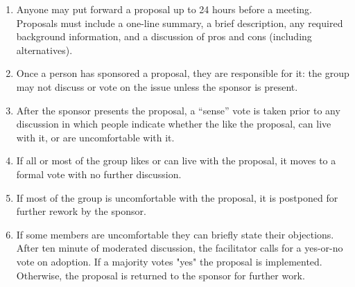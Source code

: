 \documentclass[10pt,letterpaper]{article}
\begin{document}
\begin{enumerate}

\item
  Anyone may put forward a proposal up to 24 hours before a meeting.
  Proposals must include a one-line summary,
  a brief description,
  any required background information,
  and a discussion of pros and cons (including alternatives).

\item
  Once a person has sponsored a proposal, they are responsible for it:
  the group may not discuss or vote on the issue unless the sponsor is present.

\item
  After the sponsor presents the proposal,
  a ``sense'' vote is taken prior to any discussion
  in which people indicate whether the like the proposal,
  can live with it,
  or are uncomfortable with it.

\item
  If all or most of the group likes or can live with the proposal,
  it moves to a formal vote with no further discussion.

\item
  If most of the group is uncomfortable with the proposal,
  it is postponed for further rework by the sponsor.

\item
  If some members are uncomfortable they can briefly state their objections.
  After ten minute of moderated discussion,
  the facilitator calls for a yes-or-no vote on adoption.
  If a majority votes "yes" the proposal is implemented.
  Otherwise, the proposal is returned to the sponsor for further work.

\end{enumerate}


\end{document}
